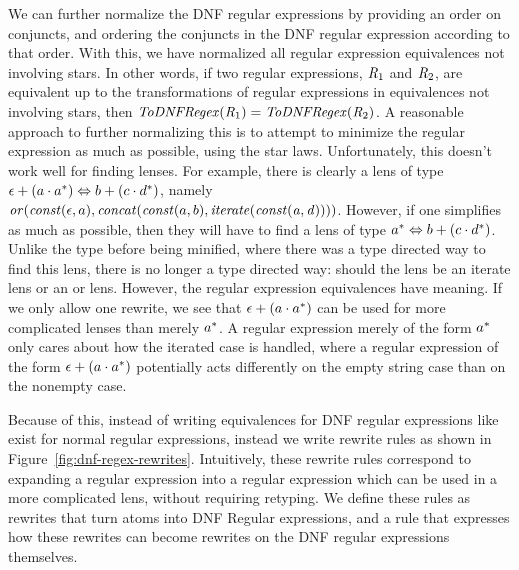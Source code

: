 We can further normalize the DNF regular expressions by providing an order on conjuncts,
and ordering the conjuncts in the DNF regular expression according to that order.
With this, we have normalized all regular expression equivalences not involving stars.
In other words, if two regular expressions, $\mathit{R}_1$ and $\mathit{R}_2$,
are equivalent up to the transformations of regular expressions in equivalences
not involving stars,
then $\mathit{ToDNFRegex}(\mathit{R}_1)=\mathit{ToDNFRegex}(\mathit{R}_2)$.
A reasonable approach to further normalizing this is to attempt to minimize the
regular expression as much as possible, using the star laws.
Unfortunately, this doesn't work
well for finding lenses.  For example, there is clearly a lens of type
$\epsilon+(a\cdot a^*) \Leftrightarrow b+(c\cdot d^*)$,
namely $\mathit{or}(\mathit{const}(\epsilon,a),\mathit{concat}(\mathit{const}(a,b),\mathit{iterate(\mathit{const}(a,d))}))$.
However, if one simplifies as much as possible, then they will have to find a lens
of type $a^* \Leftrightarrow b+(c\cdot d^*)$.
Unlike the type before being minified, where there was a type directed way to find
this lens, there is no longer a type directed way: should the lens be an iterate lens
or an or lens.
However, the regular expression equivalences have meaning.
If we only allow one rewrite, we see that
$\epsilon+(a\cdot a^*)$ can be used for more
complicated lenses than merely $a^*$.
A regular expression merely of the form $a^*$ only cares about how the iterated case is handled, where a regular expression of the form
$\epsilon+(a\cdot a^*)$ potentially acts differently on the empty
string case than on the nonempty case.


Because of this, instead of writing equivalences for DNF regular expressions like
exist for normal regular expressions,
instead we write rewrite rules as shown in
Figure~\ref{fig:dnf-regex-rewrites}.
Intuitively, these rewrite rules correspond to expanding a regular expression
into a regular expression which can be used in a more complicated lens, without requiring retyping.
We define these rules as rewrites that turn atoms into DNF Regular expressions,
and a rule that expresses how these rewrites can become rewrites on
the DNF regular expressions themselves.

